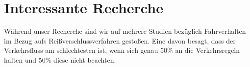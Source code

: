 \chapter{Interessante Recherche}
Während unser Recherche sind wir auf mehrere Studien bezüglich Fahrverhalten im Bezug aufs Reißverschlussverfahren gestoßen. Eine davon besagt, dass der Verkehrsfluss am schlechtesten ist, wenn sich genau 50\% an die Verkehrsregeln halten und 50\% diese nicht beachten. 